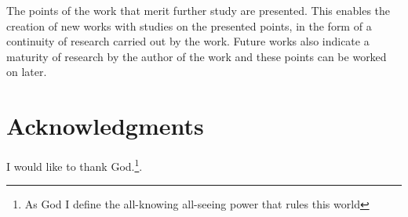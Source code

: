 \documentclass[12pt]{article}
\begin{document}
The points of the work that merit further study are presented. This enables the creation of new works with studies on the presented points, in the form of a continuity of research carried out by the work. Future works also indicate a maturity of research by the author of the work and these points can be worked on later.
	
	\section*{Acknowledgments}
	I would like to thank God.\footnote{As God I define the all-knowing all-seeing power that rules this world}.
	
    
    
	
\end{document}
